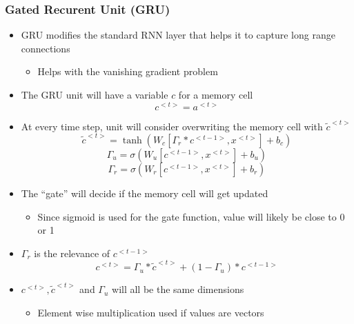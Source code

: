 \documentclass[12pt, letterpaper]{article}
\begin{document}
    \subsubsection{Gated Recurent Unit (GRU)}
    \begin{itemize}
        \item GRU modifies the standard RNN layer that helps it to capture long range connections
        \begin{itemize}
            \item Helps with the vanishing gradient problem
        \end{itemize}
        \item The GRU unit will have a variable $c$ for a memory cell
        $$c^{<t>}=a^{<t>}$$
        \item At every time step, unit will consider overwriting the memory cell with $\tilde{c}^{<t>}$
        $$\tilde{c}^{<t>}=\tanh(W_c[\Gamma_r*c^{<t-1>},x^{<t>}]+b_c)$$
        $$\Gamma_u=\sigma(W_u[c^{<t-1>},x^{<t>}]+b_u)$$
        $$\Gamma_r=\sigma(W_r[c^{<t-1>},x^{<t>}]+b_r)$$
        \item The ``gate'' will decide if the memory cell will get updated
        \begin{itemize}
            \item Since sigmoid is used for the gate function, value will likely be close to 0 or 1
        \end{itemize}
        \item $\Gamma_r$ is the relevance of $c^{<t-1>}$
        $$c ^{<t>}=\Gamma_u*\tilde{c}^{<t>}+(1-\Gamma_u)*c^{<t-1>}$$
        \item $c^{<t>},\tilde{c}^{<t>}$ and $\Gamma_u$ will all be the same dimensions
        \begin{itemize}
            \item Element wise multiplication used if values are vectors
        \end{itemize}
    \end{itemize}
\end{document}
